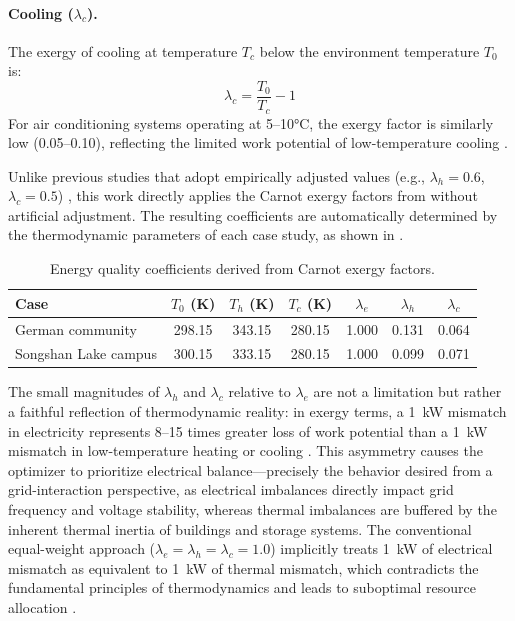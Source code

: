 \paragraph{Cooling ($\lambda_c$).} The exergy of cooling at temperature $T_c$ below the environment temperature $T_0$ is:
\begin{equation}
    \lambda_c = \frac{T_0}{T_c} - 1
    \label{eq:lambda_c}
\end{equation}
For air conditioning systems operating at 5--10°C, the exergy factor is similarly low (0.05--0.10), reflecting the limited work potential of low-temperature cooling \cite{sakulpipatsin2010exergy}.

Unlike previous studies that adopt empirically adjusted values (e.g., $\lambda_h = 0.6$, $\lambda_c = 0.5$) \cite{chen2023exergy,wang2023exergy}, this work directly applies the Carnot exergy factors from  without artificial adjustment. The resulting coefficients are automatically determined by the thermodynamic parameters of each case study, as shown in .

\begin{table}[htbp]
\centering
\caption{Energy quality coefficients derived from Carnot exergy factors.}
\label{tab:lambda_values}
\small
\begin{tabular}{@{}lcccccc@{}}
\toprule
Case & $T_0$ (K) & $T_h$ (K) & $T_c$ (K) & $\lambda_e$ & $\lambda_h$ & $\lambda_c$ \\
\midrule
German community & 298.15 & 343.15 & 280.15 & 1.000 & 0.131 & 0.064 \\
Songshan Lake campus & 300.15 & 333.15 & 280.15 & 1.000 & 0.099 & 0.071 \\
\bottomrule
\end{tabular}
\end{table}

The small magnitudes of $\lambda_h$ and $\lambda_c$ relative to $\lambda_e$ are not a limitation but rather a faithful reflection of thermodynamic reality: in exergy terms, a 1~kW mismatch in electricity represents 8--15 times greater loss of work potential than a 1~kW mismatch in low-temperature heating or cooling \cite{hu2020eqc,li2022exergyflow}. This asymmetry causes the optimizer to prioritize electrical balance---precisely the behavior desired from a grid-interaction perspective, as electrical imbalances directly impact grid frequency and voltage stability, whereas thermal imbalances are buffered by the inherent thermal inertia of buildings and storage systems. The conventional equal-weight approach ($\lambda_e = \lambda_h = \lambda_c = 1.0$) implicitly treats 1~kW of electrical mismatch as equivalent to 1~kW of thermal mismatch, which contradicts the fundamental principles of thermodynamics and leads to suboptimal resource allocation \cite{chen2024joint,duo2025matching}.

